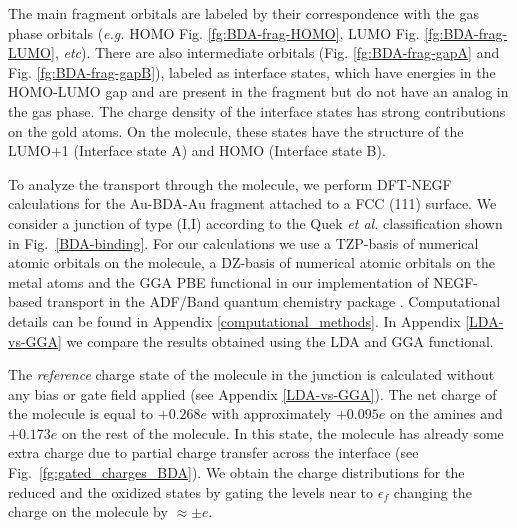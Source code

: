 \documentclass[aip,jcp,a4paper,reprint,floatfix,superscriptaddress]{revtex4-1}
\newcommand{\etal}{\emph{et al.}\xspace}
\newcommand{\eg}{\emph{e.g.}\xspace}
\begin{document}
The main fragment orbitals are labeled by their correspondence with the %
gas phase orbitals (\eg HOMO Fig. \ref{fg:BDA-frag-HOMO}, LUMO Fig. \ref{fg:BDA-frag-LUMO}, \textit{etc}). There are also intermediate orbitals (Fig. \ref{fg:BDA-frag-gapA} and Fig. \ref{fg:BDA-frag-gapB}), labeled as interface states, which have energies in the HOMO-LUMO gap and are present in the fragment but do not have an analog in the gas phase. The charge density of the interface states has strong contributions on the gold atoms. On the molecule, these states have the structure of the LUMO+1 (Interface state A) and HOMO (Interface state B).



To analyze the transport through the molecule, we perform DFT-NEGF calculations for the Au-BDA-Au fragment attached to a FCC (111) surface. We consider a junction of type (I,I) according to the Quek \etal classification \cite{Quek2007} shown in Fig.~\ref{BDA-binding}. For our calculations we use a TZP-basis of numerical atomic orbitals on the molecule, a DZ-basis of numerical atomic orbitals on the metal atoms and the GGA PBE functional in our implementation of NEGF-based transport in the ADF/Band quantum chemistry package \cite{Velde1991,Wiesenekker1991,Verzijl2012}. Computational details can be found in Appendix \ref{computational_methods}. In Appendix \ref{LDA-vs-GGA} we compare the results obtained %
using the LDA and GGA functional.

The \textit{reference} charge state of the molecule in the junction is calculated without any bias or gate field applied (see Appendix \ref{LDA-vs-GGA}). The net charge of the molecule is equal to $+0.268e$ with approximately $+0.095e$ on the amines and $+0.173e$ on the rest of the molecule. In this state, the molecule has already some extra charge due to partial charge transfer across the interface \cite{Thygesen2009} (see Fig.~\ref{fg:gated_charges_BDA}). We obtain the charge distributions for the reduced and the oxidized states by gating the levels near to $\epsilon_f$ changing the charge on the molecule by $\approx \pm e$.

\end{document}
